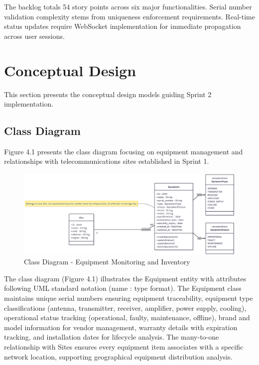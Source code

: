 The backlog totals 54 story points across six major functionalities. Serial number validation complexity stems from uniqueness enforcement requirements. Real-time status updates require WebSocket implementation for immediate propagation across user sessions.

\section{Conceptual Design}

This section presents the conceptual design models guiding Sprint 2 implementation.

\subsection{Class Diagram}

Figure 4.1 presents the class diagram focusing on equipment management and relationships with telecommunications sites established in Sprint 1.

\begin{figure}[H]
    \centering
    \includegraphics[width=0.95\linewidth]{img/chap_04/equipment_class_diagram.png}
    \caption{Class Diagram - Equipment Monitoring and Inventory}
    \label{fig:class_diagram_sprint2}
\end{figure}


The class diagram (Figure 4.1) illustrates the Equipment entity with attributes following UML standard notation (name : type format). The Equipment class maintains unique serial numbers ensuring equipment traceability, equipment type classifications (antenna, transmitter, receiver, amplifier, power supply, cooling), operational status tracking (operational, faulty, maintenance, offline), brand and model information for vendor management, warranty details with expiration tracking, and installation dates for lifecycle analysis. The many-to-one relationship with Sites ensures every equipment item associates with a specific network location, supporting geographical equipment distribution analysis.

